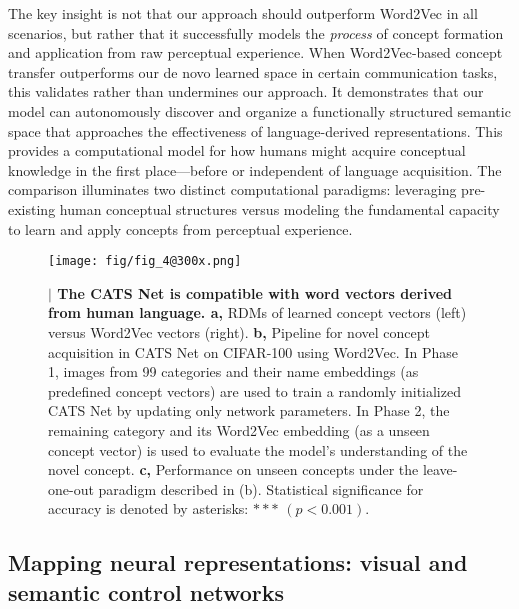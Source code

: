 \documentclass[pdflatex,sn-mathphys-num,lineno]{sn-jnl}%
\begin{document}
\begin{CJK}{UTF8}{gbsn}
The key insight is not that our approach should outperform Word2Vec in all scenarios, but rather that it successfully models the \textit{process} of concept formation and application from raw perceptual experience. When Word2Vec-based concept transfer outperforms our de novo learned space in certain communication tasks, this validates rather than undermines our approach. It demonstrates that our model can autonomously discover and organize a functionally structured semantic space that approaches the effectiveness of language-derived representations. This provides a computational model for how humans might acquire conceptual knowledge in the first place—before or independent of language acquisition. The comparison illuminates two distinct computational paradigms: leveraging pre-existing human conceptual structures versus modeling the fundamental capacity to learn and apply concepts from perceptual experience.

\begin{figure}[h]
\centering
\texttt{[image: fig/fig\_4@300x.png]}
\caption{
\textbf{$\vert$ The CATS Net is compatible with word vectors derived from human language. a, }RDMs of learned concept vectors (left) versus Word2Vec vectors (right). 
\textbf{b,} Pipeline for novel concept acquisition in CATS Net on CIFAR-100 using Word2Vec. In Phase 1, images from 99 categories and their name embeddings (as predefined concept vectors) are used to train a randomly initialized CATS Net by updating only network parameters. In Phase 2, the remaining category and its Word2Vec embedding (as a unseen concept vector) is used to evaluate the model’s understanding of the novel concept. \textbf{c,} Performance on unseen concepts under the leave-one-out paradigm described in (b). Statistical significance for accuracy is denoted by asterisks: $***$ $(p < 0.001)$.}
\label{fig4}
\end{figure}

\subsection{Mapping neural representations: visual and semantic control networks}


\end{CJK}
\end{document}
